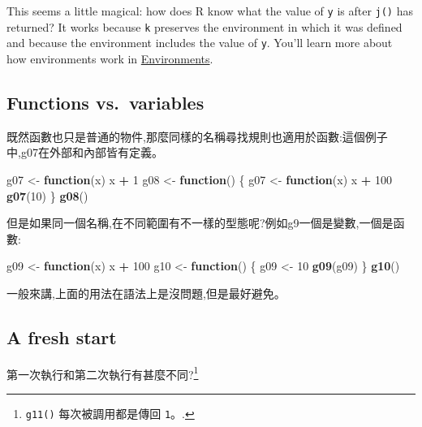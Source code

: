 \documentclass[]{book}
\newenvironment{Shaded}{\begin{snugshade}}{\end{snugshade}}
\newcommand{\ControlFlowTok}[1]{\textcolor[rgb]{0.13,0.29,0.53}{\textbf{#1}}}
\newcommand{\DecValTok}[1]{\textcolor[rgb]{0.00,0.00,0.81}{#1}}
\newcommand{\KeywordTok}[1]{\textcolor[rgb]{0.13,0.29,0.53}{\textbf{#1}}}
\newcommand{\NormalTok}[1]{#1}
\newcommand{\OperatorTok}[1]{\textcolor[rgb]{0.81,0.36,0.00}{\textbf{#1}}}
\newcommand{\StringTok}[1]{\textcolor[rgb]{0.31,0.60,0.02}{#1}}
\let\rmarkdownfootnote\footnote%
\def\footnote{\protect\rmarkdownfootnote}
\theoremstyle{definition}
\theoremstyle{definition}
\theoremstyle{definition}
\theoremstyle{remark}
\begin{document}
This seems a little magical: how does R know what the value of
\texttt{y} is after \texttt{j()} has returned? It works because
\texttt{k} preserves the environment in which it was defined and because
the environment includes the value of \texttt{y}. You'll learn more
about how environments work in
\protect\hyperlink{environments}{Environments}.

\hypertarget{functions-vs.variables}{%
\subsection{Functions vs.~variables}\label{functions-vs.variables}}

既然函數也只是普通的物件,那麼同樣的名稱尋找規則也適用於函數:這個例子中,g07在外部和內部皆有定義。

\begin{Shaded}
\begin{Highlighting}[]
\NormalTok{g07 <-}\StringTok{ }\ControlFlowTok{function}\NormalTok{(x) x }\OperatorTok{+}\StringTok{ }\DecValTok{1}
\NormalTok{g08 <-}\StringTok{ }\ControlFlowTok{function}\NormalTok{() \{}
\NormalTok{  g07 <-}\StringTok{ }\ControlFlowTok{function}\NormalTok{(x) x }\OperatorTok{+}\StringTok{ }\DecValTok{100}
  \KeywordTok{g07}\NormalTok{(}\DecValTok{10}\NormalTok{)}
\NormalTok{\}}
\KeywordTok{g08}\NormalTok{()}
\end{Highlighting}
\end{Shaded}

但是如果同一個名稱,在不同範圍有不一樣的型態呢?例如g9一個是變數,一個是函數:

\begin{Shaded}
\begin{Highlighting}[]
\NormalTok{g09 <-}\StringTok{ }\ControlFlowTok{function}\NormalTok{(x) x }\OperatorTok{+}\StringTok{ }\DecValTok{100}
\NormalTok{g10 <-}\StringTok{ }\ControlFlowTok{function}\NormalTok{() \{}
\NormalTok{  g09 <-}\StringTok{ }\DecValTok{10}
  \KeywordTok{g09}\NormalTok{(g09)}
\NormalTok{\}}
\KeywordTok{g10}\NormalTok{()}
\end{Highlighting}
\end{Shaded}

一般來講,上面的用法在語法上是沒問題,但是最好避免。

\hypertarget{fresh-start}{%
\subsection{A fresh start}\label{fresh-start}}

第一次執行和第二次執行有甚麼不同?\footnote{\texttt{g11()}
  每次被調用都是傳回 \texttt{1}。.}
\end{document}
